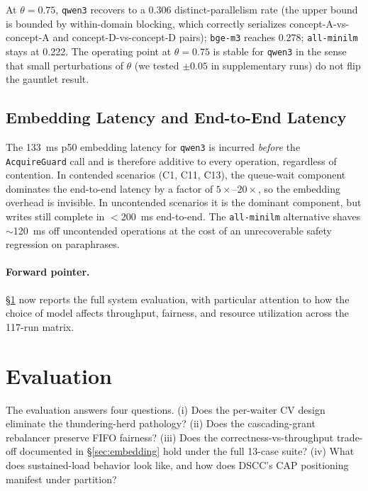 \documentclass[sigconf]{acmart}
\begin{document}
At $\theta=0.75$, \texttt{qwen3} recovers to a 0.306 distinct-parallelism
rate (the upper bound is bounded by within-domain blocking, which
correctly serializes concept-A-vs-concept-A and concept-D-vs-concept-D
pairs); \texttt{bge-m3} reaches 0.278; \texttt{all-minilm} stays at
0.222. The operating point at $\theta=0.75$ is stable for \texttt{qwen3}
in the sense that small perturbations of $\theta$ (we tested
$\pm 0.05$ in supplementary runs) do not flip the gauntlet result.

\subsection{Embedding Latency and End-to-End Latency}
\label{sec:emb-latency}

The 133~ms p50 embedding latency for \texttt{qwen3} is incurred
\emph{before} the \texttt{AcquireGuard} call and is therefore additive
to every operation, regardless of contention. In contended scenarios
(C1, C11, C13), the queue-wait component dominates the end-to-end
latency by a factor of $5\times$--$20\times$, so the embedding
overhead is invisible. In uncontended scenarios it is the dominant
component, but writes still complete in $<$200~ms end-to-end. The
\texttt{all-minilm} alternative shaves $\sim$120~ms off uncontended
operations at the cost of an unrecoverable safety regression on
paraphrases.

\paragraph{Forward pointer.}
\S\ref{sec:eval} now reports the full system evaluation, with
particular attention to how the choice of model affects throughput,
fairness, and resource utilization across the 117-run matrix.

\section{Evaluation}
\label{sec:eval}

The evaluation answers four questions. (i) Does the per-waiter CV
design eliminate the thundering-herd pathology? (ii) Does the
cascading-grant rebalancer preserve FIFO fairness? (iii) Does the
correctness-vs-throughput trade-off documented in \S\ref{sec:embedding}
hold under the full 13-case suite? (iv) What does sustained-load
behavior look like, and how does DSCC's CAP positioning manifest under
partition?
\end{document}
